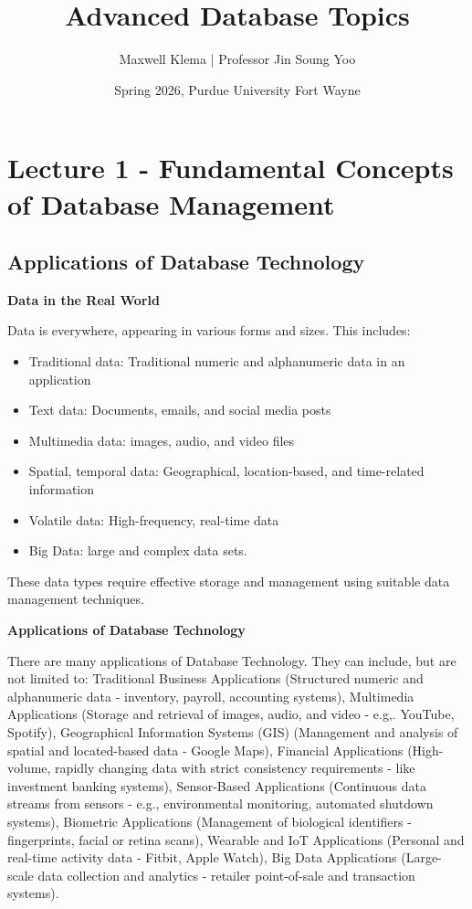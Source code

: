 \documentclass[11pt]{article}
\title{Advanced Database Topics}
\date{Spring 2026, Purdue University Fort Wayne}
\author{Maxwell Klema | Professor Jin Soung Yoo}
\begin{document}
\maketitle
\pagestyle{fancy}

\vspace{11pt}
\section{Lecture 1 - Fundamental Concepts of Database Management}
\vspace{11pt}

\subsection{Applications of Database Technology}
\vspace{11pt}

\textbf{Data in the Real World}
\vspace{11pt}

Data is everywhere, appearing in various forms and sizes. This includes:
\begin{itemize}
    \item Traditional data: Traditional numeric and alphanumeric data in an application
    \item Text data: Documents, emails, and social media posts
    \item Multimedia data: images, audio, and video files
    \item Spatial, temporal data: Geographical, location-based, and time-related information
    \item Volatile data: High-frequency, real-time data
    \item Big Data: large and complex data sets.
\end{itemize}

These data types require effective storage and management using suitable data management techniques.

\vspace{11pt}
\textbf{Applications of Database Technology}
\vspace{11pt}

There are many applications of Database Technology. They can include, but are not limited to: Traditional Business Applications (Structured numeric and alphanumeric data - inventory, payroll, accounting systems), Multimedia Applications (Storage and retrieval of images, audio, and video - e.g,. YouTube, Spotify), Geographical Information Systems (GIS) (Management and analysis of spatial and located-based data - Google Maps), Financial Applications (High-volume, rapidly changing data with strict consistency requirements - like investment banking systems), Sensor-Based Applications (Continuous data streams from sensors - e.g., environmental monitoring, automated shutdown systems), Biometric Applications (Management of biological identifiers - fingerprints, facial or retina scans), Wearable and IoT Applications (Personal and real-time activity data - Fitbit, Apple Watch), Big Data Applications (Large-scale data collection and analytics - retailer point-of-sale and transaction systems).
\end{document}
